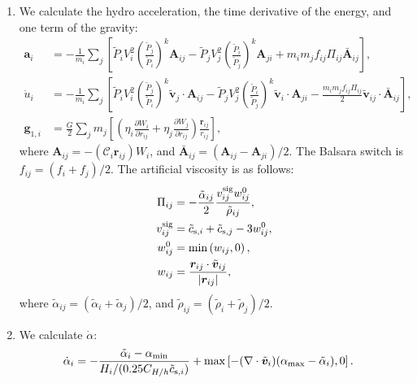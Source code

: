 \documentclass[fleqn,dvipdfmx]{article}
\begin{document}
\begin{enumerate}
\item We calculate the hydro acceleration, the time derivative of the
  energy, and one term of the gravity:
  \begin{align}
    \bm{a}_i &= - \frac{1}{m_i} \sum_j \left[ \tilde{P}_i V_i^2 \left(
      \frac{\tilde{P}_j}{\tilde{P}_i} \right)^k \bm{A}_{ij} -
      \tilde{P}_j V_j^2 \left( \frac{\tilde{P}_i}{\tilde{P}_j}
      \right)^k \bm{A}_{ji} + m_i m_j f_{ij} \Pi_{ij}
      \bar{\bm{A}}_{ij} \right], \\
    \dot{u}_i &= - \frac{1}{m_i} \sum_j \left[ \tilde{P}_i V_i^2
      \left( \frac{\tilde{P}_j}{\tilde{P}_i} \right)^k
      \tilde{\bm{v}}_j \cdot \bm{A}_{ij} - \tilde{P}_j V_j^2 \left(
      \frac{\tilde{P}_i}{\tilde{P}_j} \right)^k \tilde{\bm{v}}_i \cdot
      \bm{A}_{ji} - \frac{m_i m_j f_{ij} \Pi_{ij}}{2}
      \tilde{\bm{v}}_{ij} \cdot \bar{\bm{A}}_{ij} \right], \\
    \bm{g}_{1,i} &= \frac{G}{2} \sum_j m_j \left[ \left( \eta_i
      \frac{\partial W_{i}}{\partial r_{ij}} + \eta_j \frac{\partial
        W_{j}}{\partial r_{ij}} \right) \frac{\bm{r}_{ij}}{r_{ij}}
      \right],
\end{align}
  where $\bm{A}_{ij}=- \left( \mathcal{C}_i \bm{r}_{ij} \right) W_i$,
  and $\bar{\bm{A}}_{ij}=\left( \bm{A}_{ij} - \bm{A}_{ji}
  \right)/2$. The Balsara switch is $f_{ij} = (f_i + f_j)/2$. The
  artificial viscosity is as follows:
  \begin{align}
    \Pi_{ij} &= - \frac{\tilde{\alpha}_{ij}}{2} \frac{v_{ij}^{\rm sig}
      w_{ij}^0}{\tilde{\rho}_{ij}}, \\
    v_{ij}^{\rm sig} &= \tilde{c}_{{\rm s},i} + \tilde{c}_{{\rm s},j}
    - 3w_{ij}^0, \\
    w_{ij}^0 &= \min \left(w_{ij},0\right), \\
    w_{ij} &= \frac{\bm{r}_{ij} \cdot
      \tilde{\bm{v}}_{ij}}{|\bm{r}_{ij}|},
  \end{align}
  where $\tilde{\alpha}_{ij}=(\tilde{\alpha}_i+\tilde{\alpha}_j)/2$,
  and $\tilde{\rho}_{ij}=(\tilde{\rho}_i+\tilde{\rho}_j)/2$.

\item We calculate $\dot{\alpha}$:
  \begin{align}
    \dot{\alpha}_i &= - \frac{\tilde{\alpha}_i - \alpha_{\rm
        min}}{H_i/(0.25C_{H/h}\tilde{c}_{{\rm s},i})} + \max \left[
      -(\nabla \cdot \tilde{\bm{v}}_i)(\alpha_{\rm
        max}-\tilde{\alpha}_i), 0 \right].
  \end{align}


\end{enumerate}
\end{document}
